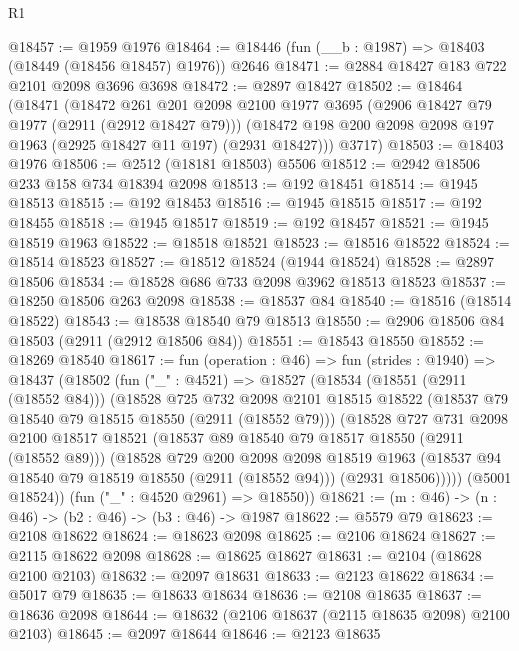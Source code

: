 \begin{lexlean}{R1}
\begin{coremodule}
@18457 := @1959 @1976
@18464 := @18446 (fun (__b : @1987) => @18403 (@18449 (@18456 @18457) @1976)) @2646
@18471 := @2884 @18427 @183 @722 @2101 @2098 @3696 @3698
@18472 := @2897 @18427
@18502 := @18464
    (@18471
      (@18472
        @261
        @201
        @2098
        @2100
        @1977
        @3695
        (@2906 @18427 @79 @1977 (@2911 (@2912 @18427 @79)))
        (@18472 @198 @200 @2098 @2098 @197 @1963 (@2925 @18427 @11 @197) (@2931 @18427)))
      @3717)
@18503 := @18403 @1976
@18506 := @2512 (@18181 @18503) @5506
@18512 := @2942 @18506 @233 @158 @734 @18394 @2098
@18513 := @192 @18451
@18514 := @1945 @18513
@18515 := @192 @18453
@18516 := @1945 @18515
@18517 := @192 @18455
@18518 := @1945 @18517
@18519 := @192 @18457
@18521 := @1945 @18519 @1963
@18522 := @18518 @18521
@18523 := @18516 @18522
@18524 := @18514 @18523
@18527 := @18512 @18524 (@1944 @18524)
@18528 := @2897 @18506
@18534 := @18528 @686 @733 @2098 @3962 @18513 @18523
@18537 := @18250 @18506 @263 @2098
@18538 := @18537 @84
@18540 := @18516 (@18514 @18522)
@18543 := @18538 @18540 @79 @18513
@18550 := @2906 @18506 @84 @18503 (@2911 (@2912 @18506 @84))
@18551 := @18543 @18550
@18552 := @18269 @18540
@18617 := fun (operation : @46) =>
  fun (strides : @1940) =>
  @18437
    (@18502
      (fun ("_" : @4521) =>
      @18527
        (@18534
          (@18551 (@2911 (@18552 @84)))
          (@18528
            @725
            @732
            @2098
            @2101
            @18515
            @18522
            (@18537 @79 @18540 @79 @18515 @18550 (@2911 (@18552 @79)))
            (@18528
              @727
              @731
              @2098
              @2100
              @18517
              @18521
              (@18537 @89 @18540 @79 @18517 @18550 (@2911 (@18552 @89)))
              (@18528
                @729
                @200
                @2098
                @2098
                @18519
                @1963
                (@18537 @94 @18540 @79 @18519 @18550 (@2911 (@18552 @94)))
                (@2931 @18506)))))
        (@5001 @18524))
      (fun ("_" : @4520 @2961) => @18550))
@18621 := (m : @46) -> (n : @46) -> (b2 : @46) -> (b3 : @46) -> @1987
@18622 := @5579 @79
@18623 := @2108 @18622
@18624 := @18623 @2098
@18625 := @2106 @18624
@18627 := @2115 @18622 @2098
@18628 := @18625 @18627
@18631 := @2104 (@18628 @2100 @2103)
@18632 := @2097 @18631
@18633 := @2123 @18622
@18634 := @5017 @79
@18635 := @18633 @18634
@18636 := @2108 @18635
@18637 := @18636 @2098
@18644 := @18632 (@2106 @18637 (@2115 @18635 @2098) @2100 @2103)
@18645 := @2097 @18644
@18646 := @2123 @18635

\end{coremodule}
\end{lexlean}
